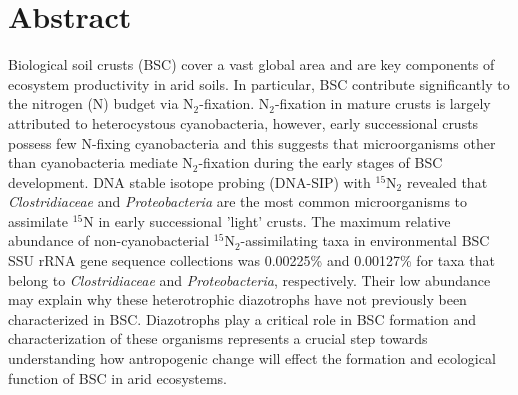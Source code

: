 \section{Abstract}
Biological soil crusts (BSC) cover a vast global area and are key
components of ecosystem productivity in arid soils. In particular, BSC
contribute significantly to the nitrogen (N) budget
via N$_{2}$-fixation.  N$_{2}$-fixation in mature crusts is largely
attributed to heterocystous cyanobacteria, however, early successional
crusts possess few N-fixing cyanobacteria and this
suggests that microorganisms other than cyanobacteria mediate
N$_{2}$-fixation during the early stages of BSC development. DNA stable
isotope probing (DNA-SIP) with $^{15}$N$_{2}$ revealed that
\textit{Clostridiaceae} and \textit{Proteobacteria} are the most common
microorganisms to assimilate $^{15}$N in early successional 'light'
crusts.  The maximum relative abundance of non-cyanobacterial
$^{15}$N$_{2}$-assimilating taxa in environmental BSC SSU rRNA gene
sequence collections was 0.00225\% and 0.00127\% for taxa that belong
to \textit{Clostridiaceae} and \textit{Proteobacteria}, respectively.
Their low abundance may explain why these heterotrophic diazotrophs
have not previously been characterized in BSC.  Diazotrophs play a
critical role in BSC formation and characterization of these organisms
represents a crucial step towards understanding how antropogenic change
will effect the formation and ecological function of BSC in arid
ecosystems.


